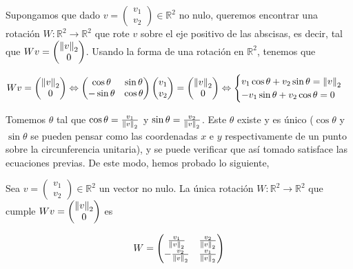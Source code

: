 Supongamos que dado $v = \begin{pmatrix}v_1 \\ v_2 \end{pmatrix} \in \mathbb{R}^2$ no nulo, queremos encontrar una rotación $W : \mathbb{R}^2 \to \mathbb{R}^2$ que rote $v$ sobre el eje positivo de las abscisas, es decir, tal que $Wv = \begin{pmatrix}\left\lVert v\right\rVert_2 \\ 0\end{pmatrix}$. Usando la forma de una rotación en $\mathbb{R}^2$, tenemos que

\[Wv = \begin{pmatrix}\left\lVert v\right\rVert_2 \\ 0\end{pmatrix} \Leftrightarrow
\begin{pmatrix}
\cos \theta & \sin \theta \\
-\sin \theta & \cos \theta
\end{pmatrix} \begin{pmatrix}v_1 \\ v_2\end{pmatrix} =
\begin{pmatrix}\left\lVert v\right\rVert_2 \\ 0\end{pmatrix} \Leftrightarrow
\begin{cases}
v_1 \cos \theta  + v_2 \sin \theta  = \left\lVert v\right\rVert_2 \\
-v_1 \sin \theta  + v_2 \cos \theta  = 0
\end{cases}\]

Tomemos $\theta$ tal que $\cos \theta = \frac{v_1}{\left\lVert v\right\rVert_2}$ y  $\sin \theta = \frac{v_2}{\left\lVert v\right\rVert_2}$. Este $\theta$ existe y es único ($\cos \theta$ y $\sin \theta$ se pueden pensar como las coordenadas $x$ e $y$ respectivamente de un punto sobre la circunferencia unitaria), y se puede verificar que así tomado satisface las ecuaciones previas. De este modo, hemos probado lo siguiente,

\begin{propo}
Sea $v = \begin{pmatrix}v_1 \\ v_2 \end{pmatrix} \in \mathbb{R}^2$ un vector no nulo. La única rotación $W : \mathbb{R}^2 \to \mathbb{R}^2$ que cumple $Wv = \begin{pmatrix}\left\lVert v\right\rVert_2 \\ 0 \end{pmatrix}$ es

\[W = \begin{pmatrix}
\frac{v_1}{\left\lVert v\right\rVert_2} & \frac{v_2}{\left\lVert v\right\rVert_2}\\
-\frac{v_2}{\left\lVert v\right\rVert_2} & \frac{v_1}{\left\lVert v\right\rVert_2}
\end{pmatrix}\]
\end{propo}

